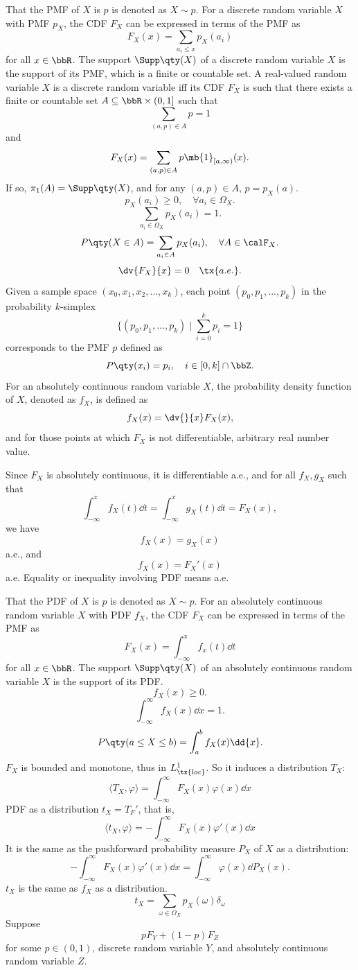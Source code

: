 \documentclass[a4paper,12pt]{report}
\begin{document}
That the PMF of $X$ is $p$ is denoted as $X\sim p$.
For a discrete random variable $X$ with PMF $p_X$, the CDF $F_X$ can be expressed in terms of the PMF as
\[F_X(x)=\sum_{a_i\le x}p_X(a_i)\]
for all $x\in\bbR$.
The support $\Supp\qty(X)$ of a discrete random variable $X$ is the support of its PMF, which is a finite or countable set.
A real-valued random variable $X$ is a discrete random variable iff its CDF $F_X$ is such that there exists a finite or countable set $A\subseteq\bbR\times(0,1]$ such that
\[\sum_{(a,p)\in A}p=1\]
and
\[F_X(x)=\sum_{(a,p)\in A}p\mb{1}_{[a,\infty)}(x).\]
If so, $\pi_1(A)=\Supp\qty(X)$, and for any $(a,p)\in A$, $p=p_X(a)$.
\[p_X(a_i)\ge 0,\quad\forall a_i\in\Omega_X.\]
\[\sum_{a_i\in\Omega_X}p_X(a_i)=1.\]
\[P\qty(X\in A)=\sum_{a_i\in A}p_X(a_i),\quad\forall A\in\calF_X.\]
\[\dv{F_X}{x}=0\quad\tx{a.e.}.\]
Given a sample space $(x_0,x_1,x_2,\ldots,x_k)$, each point $(p_0,p_1,\ldots,p_k)$ in the probability $k$-simplex
\[\{(p_0,p_1,\ldots,p_k)\mid\sum_{i=0}^kp_i=1\}\]
corresponds to the PMF $p$ defined as
\[P\qty(x_i)=p_i,\quad i\in[0,k]\cap\bbZ.\]
For an absolutely continuous random variable $X$, the probability density function of $X$, denoted as $f_X$, is defined as
\[f_X(x)=\dv{}{x}F_X(x),\]
and for those points at which $F_X$ is not differentiable, arbitrary real number value.

Since $F_X$ is absolutely continuous, it is differentiable a.e., and for all $f_X,g_X$ such that
\[\int_{-\infty}^xf_X(t)\dd{t}=\int_{-\infty}^xg_X(t)\dd{t}=F_X(x),\]
we have
\[f_X(x)=g_X(x)\]
a.e., and
\[f_X(x)=F_X'(x)\]
a.e. Equality or inequality involving PDF means a.e.

That the PDF of $X$ is $p$ is denoted as $X\sim p$.
For an absolutely continuous random variable $X$ with PDF $f_X$, the CDF $F_X$ can be expressed in terms of the PMF as
\[F_X(x)=\int_{-\infty}^xf_x(t)\dd{t}\]
for all $x\in\bbR$.
The support $\Supp\qty(X)$ of an absolutely continuous random variable $X$ is the support of its PDF.
\[f_X(x)\ge 0.\]
\[\int_{-\infty}^{\infty}f_X(x)\dd{x}=1.\]
\[P\qty(a\le X\le b)=\int_a^bf_X(x)\dd{x}.\]
$F_X$ is bounded and monotone, thus in $L^1_{\tx{loc}}$. So it induces a distribution $T_X$:
\[\langle T_X,\varphi\rangle=\int_{-\infty}^{\infty}F_X(x)\varphi(x)\dd{x}\]
PDF as a distribution $t_X=T_F'$, that is,
\[\langle t_X,\varphi\rangle=-\int_{-\infty}^{\infty}F_X(x)\varphi'(x)\dd{x}\]
It is the same as the pushforward probability measure $P_X$ of $X$ as a distribution:
\[-\int_{-\infty}^{\infty}F_X(x)\varphi'(x)\dd{x}=\int_{-\infty}^{\infty}\varphi(x)\dd{P_X(x)}.\]
$t_X$ is the same as $f_X$ as a distribution.
\[t_X=\sum_{\omega\in\Omega_X}p_X(\omega)\delta_{\omega}\]
Suppose
\[pF_Y+(1-p)F_Z\]
for some $p\in(0,1)$, discrete random variable $Y$, and absolutely continuous random variable $Z$.
\end{document}

